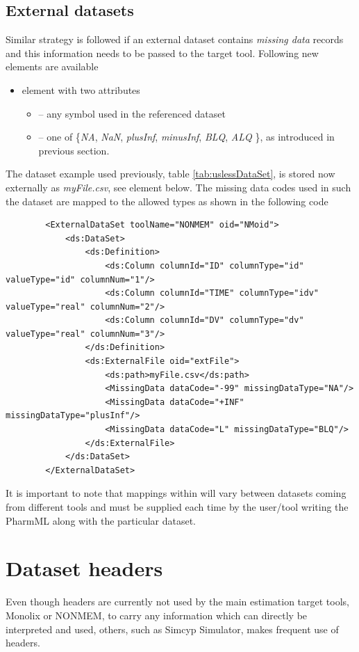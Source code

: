\subsection{External datasets}
Similar strategy is followed if an external dataset contains \emph{missing data}
records and this information needs to be passed to the target tool. Following 
new elements are available 
\begin{itemize}
\item 
{} element with two attributes 
\begin{itemize}
\item 
{} -- any symbol used in the referenced dataset
\item 
{} -- one of \{\emph{NA}, \emph{NaN}, \emph{plusInf}, \emph{minusInf}, 
\emph{BLQ}, \emph{ALQ} \}, as introduced in previous section.
\end{itemize}
\end{itemize}                
The dataset example used previously, table \ref{tab:uslessDataSet}, is stored now
externally as \emph{myFile.csv}, see  element below.
The missing data codes used in such the dataset are mapped to the allowed types
as shown in the following code
\lstset{language=XML}
\begin{lstlisting}
        <ExternalDataSet toolName="NONMEM" oid="NMoid">
            <ds:DataSet>
                <ds:Definition>
                    <ds:Column columnId="ID" columnType="id" valueType="id" columnNum="1"/>
                    <ds:Column columnId="TIME" columnType="idv" valueType="real" columnNum="2"/>
                    <ds:Column columnId="DV" columnType="dv" valueType="real" columnNum="3"/>
                </ds:Definition>
                <ds:ExternalFile oid="extFile">
                    <ds:path>myFile.csv</ds:path>
                    <MissingData dataCode="-99" missingDataType="NA"/>
                    <MissingData dataCode="+INF" missingDataType="plusInf"/>
                    <MissingData dataCode="L" missingDataType="BLQ"/>
                </ds:ExternalFile>
            </ds:DataSet>
        </ExternalDataSet>
\end{lstlisting}
It is important to note that mappings within  will vary between datasets
coming from different tools and must be supplied each time by the user/tool writing the 
PharmML along with the particular dataset.

\section{Dataset headers}
Even though headers are currently not used by the main estimation target 
tools, Monolix or NONMEM, to carry any information which can directly be interpreted 
and used, others, such as Simcyp Simulator, makes frequent use of headers. 

